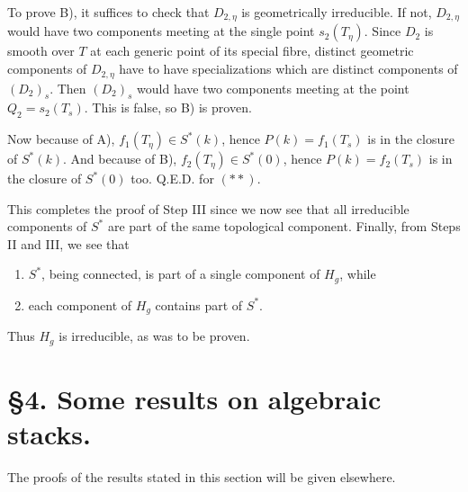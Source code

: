 \documentclass[10pt]{article}
\begin{document}
To prove B), it suffices to check that $D_{2,\eta}$ is geometrically irreducible. If not, $D_{2,\eta}$ would have two components meeting at the single point $s_2(T_\eta)$. Since $D_2$ is smooth over $T$ at each generic point of its special fibre, distinct geometric components of $D_{2,\eta}$ have to have specializations which are distinct components of $(D_2)_s$. Then $(D_2)_s$ would have two components meeting at the point $Q_2=s_2(T_s)$. This is false, so B) is proven.

Now because of A), $f_1(T_\eta)\in S^*(k)$, hence $P(k)=f_1(T_s)$ is in the closure of $S^*(k)$. And because of B), $f_2(T_\eta)\in S^*(0)$, hence $P(k)=f_2(T_s)$ is in the closure of $S^*(0)$ too. Q.E.D. for $(**)$.

This completes the proof of Step III since we now see that all irreducible components of $S^*$ are part of the same topological component. Finally, from Steps II and III, we see that
\begin{enumerate}[label=\emph{\alph*)}]
\item $S^*$, being connected, is part of a single component of $H_g$, while
\item each component of $H_g$ contains part of $S^*$.
\end{enumerate}
Thus $H_g$ is irreducible, as was to be proven.

\section*{\S 4. Some results on algebraic stacks.}

The proofs of the results stated in this section will be given elsewhere.
\end{document}

